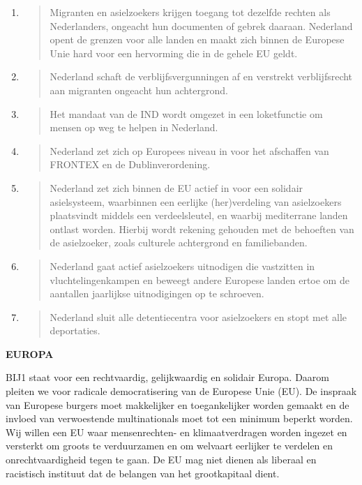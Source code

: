 \begin{enumerate}
\def\labelenumi{\arabic{enumi}.}
\item
  \begin{quote}
  Migranten en asielzoekers krijgen toegang tot dezelfde rechten als
  Nederlanders, ongeacht hun documenten of gebrek daaraan. Nederland
  opent de grenzen voor alle landen en maakt zich binnen de Europese
  Unie hard voor een hervorming die in de gehele EU geldt.
  \end{quote}
\item
  \begin{quote}
  Nederland schaft de verblijfsvergunningen af en verstrekt
  verblijfsrecht aan migranten ongeacht hun achtergrond.
  \end{quote}
\item
  \begin{quote}
  Het mandaat van de IND wordt omgezet in een loketfunctie om mensen op
  weg te helpen in Nederland.
  \end{quote}
\item
  \begin{quote}
  Nederland zet zich op Europees niveau in voor het afschaffen van
  FRONTEX en de Dublinverordening.
  \end{quote}
\item
  \begin{quote}
  Nederland zet zich binnen de EU actief in voor een solidair
  asielsysteem, waarbinnen een eerlijke (her)verdeling van asielzoekers
  plaatsvindt middels een verdeelsleutel, en waarbij mediterrane landen
  ontlast worden. Hierbij wordt rekening gehouden met de behoeften van
  de asielzoeker, zoals culturele achtergrond en familiebanden.
  \end{quote}
\item
  \begin{quote}
  Nederland gaat actief asielzoekers uitnodigen die vastzitten in
  vluchtelingenkampen en beweegt andere Europese landen ertoe om de
  aantallen jaarlijkse uitnodigingen op te schroeven.
  \end{quote}
\item
  \begin{quote}
  Nederland sluit alle detentiecentra voor asielzoekers en stopt met
  alle deportaties.
  \end{quote}
\end{enumerate}

\textbf{EUROPA}

BIJ1 staat voor een rechtvaardig, gelijkwaardig en solidair Europa.
Daarom pleiten we voor radicale democratisering van de Europese Unie
(EU). De inspraak van Europese burgers moet makkelijker en
toegankelijker worden gemaakt en de invloed van verwoestende
multinationals moet tot een minimum beperkt worden. Wij willen een EU
waar mensenrechten- en klimaatverdragen worden ingezet en versterkt om
groots te verduurzamen en om welvaart eerlijker te verdelen en
onrechtvaardigheid tegen te gaan. De EU mag niet dienen als liberaal en
racistisch instituut dat de belangen van het grootkapitaal dient.

